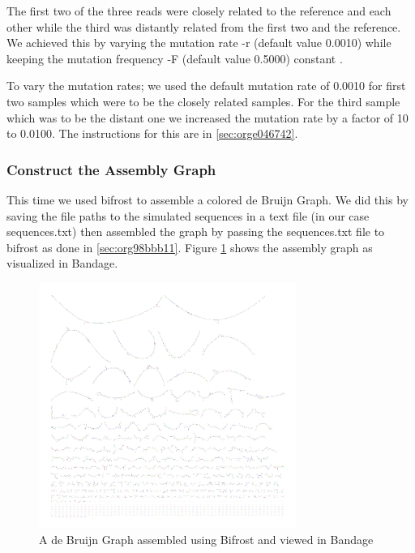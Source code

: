 \documentclass[10pt, a4paper]{article}
\begin{document}
The first two of the three reads were closely related to the reference and each
other while the third was distantly related from the first two and the
reference.
We achieved this by varying the mutation rate -r (default value 0.0010) while 
keeping the mutation frequency -F (default value 0.5000) constant
\cite{greenSuggestionsConcerningRelationship1995}.

To vary the mutation rates; we used the default mutation rate of 0.0010 for
first two samples which were to be the closely related samples. 
For the third sample which was to be the distant one we increased the mutation 
rate by a factor of 10 to 0.0100. 
The instructions for this are in \ref{sec:orge046742}.

\subsubsection{Construct the Assembly Graph}
\label{sec:orgbada448}
This time we used bifrost \cite{holleyBifrostHighlyParallel2019} to assemble a
colored de Bruijn Graph. 
We did this by saving the file paths to the simulated sequences in a text file
(in our case sequences.txt) then assembled the graph by passing the 
sequences.txt file to bifrost as done in \ref{sec:org98bbb11}.
Figure \ref{fig:org94984fc} shows the assembly graph as visualized in Bandage.

\begin{figure}[h]
\centering
\includegraphics[width=0.75\textwidth]{../Figures/SARS_CoV_2/SARS_Assembly_Graph.png}
\caption[SARS-CoV-2 Assembly Graph]{\label{fig:org94984fc}
A de Bruijn Graph assembled using Bifrost and viewed in Bandage}
\end{figure}
\end{document}
